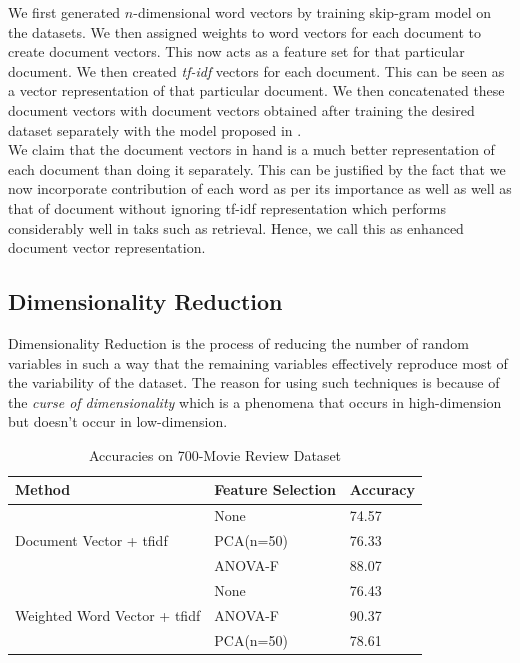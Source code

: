 \documentclass[11pt,a4paper]{article}
\begin{document}
We first generated $n$-dimensional word vectors by training skip-gram model on the datasets. We then assigned weights to word vectors for each document to create document vectors. This now acts as a feature set for that particular document. We then created \emph{tf-idf} vectors for each document. This can be seen as a vector representation of that particular document. We then concatenated these document vectors with document vectors obtained after training the desired dataset separately with the model proposed in \cite{Le:14}.\\
We claim that the document vectors in hand is a much better representation of each document than doing it separately. This can be justified by the fact that we now incorporate contribution of each word as per its importance as well as well as that of document without ignoring tf-idf representation which performs considerably well in taks such as retrieval. Hence, we call this as enhanced document vector representation.

\subsection{Dimensionality Reduction}
\label{sec:dimensionality_reduction}
Dimensionality Reduction is the process of reducing the number of random variables in such a way that the remaining variables effectively reproduce most of the variability of the dataset.
The reason for using such techniques is because of the \emph{curse of dimensionality} which is a phenomena that occurs in high-dimension but doesn't occur in low-dimension.\\

\begin{table}[h!]
\small
\begin{tabular}{|p{3.6cm}|p{1.5cm}|p{1.4cm}|}
\hline
\textbf{Method} & \textbf{Feature Selection} & \textbf{Accuracy} \\ \hline
\multirow{3}{*}{Document Vector + tfidf}              & None      & 74.57 \\ \cline{2-3} 
                                              & PCA(n=50) & 76.33 \\ \cline{2-3} 
                                              & ANOVA-F & 88.07 \\ \hline
\multirow{3}{*}{Weighted Word Vector + tfidf} & None      & 76.43 \\ \cline{2-3} 
                                              & ANOVA-F   & 90.37 \\ \cline{2-3} 
                                              & PCA(n=50) & 78.61 \\ \hline
\end{tabular}
\caption {Accuracies on 700-Movie Review Dataset}
\label{table:700_movie_features}
\end{table}
\end{document}
